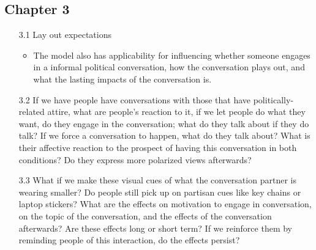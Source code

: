 \documentclass [12pt]{article}
\begin{document}
    \subsection*{Chapter 3}
        \begin{itemize}
            \item[3.1] Lay out expectations
            \begin{itemize}
                \item The model also has applicability for influencing whether someone engages in a informal political conversation, how the conversation plays out, and what the lasting impacts of the conversation is.
            \end{itemize}
            \item[3.2] If we have people have conversations with those that have politically-related attire, what are people's reaction to it, if we let people do what they want, do they engage in the conversation; what do they talk about if they do talk? If we force a conversation to happen, what do they talk about? What is their affective reaction to the prospect of having this conversation in both conditions? Do they express more polarized views afterwards?
            \item[3.3] What if we make these visual cues of what the conversation partner is wearing smaller? Do people still pick up on partisan cues like key chains or laptop stickers? What are the effects on motivation to engage in conversation, on the topic of the conversation, and the effects of the conversation afterwards? Are these effects long or short term? If we reinforce them by reminding people of this interaction, do the effects persist?
        \end{itemize}
%
\end{document}
